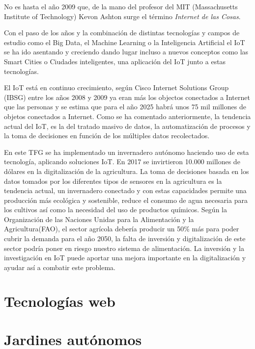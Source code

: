 \documentclass[a4paper, 12pt, oneside]{book}
\begin{document}
No es hasta el año 2009 que, de la mano del profesor del MIT (Massachusetts Institute of Technology) Kevon Ashton surge el término \textit{Internet de las Cosas}.

Con el paso de los años y la combinación de distintas tecnologías y campos de estudio como el Big Data, el Machine Learning o la Inteligencia Artificial el IoT se ha ido asentando y creciendo dando lugar incluso a nuevos conceptos como las Smart Cities o Ciudades inteligentes, una aplicación del IoT junto a estas tecnologías.

El IoT está en continuo crecimiento, según Cisco Internet Solutions Group (IBSG) entre los años 2008 y 2009 ya eran más los objectos conectados a Internet que las personas y se estima que para el año 2025 habrá unos 75 mil millones de objetos conectados a Internet. Como se ha comentado anteriormente, la tendencia actual del IoT, es la del tratado masivo de datos, la automatización de procesos y la toma de decisiones en función de los múltiples datos recolectados.

En este TFG se ha implementado un invernadero autónomo haciendo uso de esta tecnología, aplicando soluciones IoT. 
En 2017 se invirtieron 10.000 millones de dólares en la digitalización de la agricultura. La toma de decisiones basada en los datos tomados por los diferentes tipos de sensores en la agricultura es la tendencia actual, un invernadero conectado y con estas capacidades permite una producción más ecológica y sostenible, reduce el consumo de agua necesaria para los cultivos así como la necesidad del uso de productos químicos.
Según la Organización de las Naciones Unidas para la Alimentación y la Agricultura(FAO), el sector agrícola debería producir un 50\% más para poder cubrir la demanda para el año 2050, la falta de inversión y digitalización de este sector podría poner en riesgo nuestro sistema de alimentación. La inversión y la investigación en IoT puede aportar una mejora importante en la digitalización y ayudar así a combatir este problema. 



\section{Tecnologías web}
\label{tecnologías web}
\section{Jardines autónomos}
\label{sec:jardines autonomos}
\end{document}
